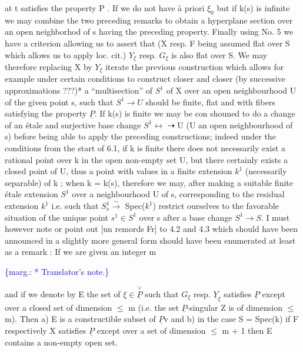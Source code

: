 \documentclass[11pt]{article}
\newcommand{\scanpage}[1]{\par\bigskip\noindent{\small\sffamily[scan #1]}\par}
\newcommand{\mspage}[1]{{\small\sffamily[p.\,#1]}}
\newcommand{\margin}[1]{\textcolor{blue}{\{\textsf{marg.:} #1\}}}
\begin{document}
at t satisfies the property P . If we do not have à priori $\xi_0$ but
if k(s) is infinite we may combine the two preceding remarks to
obtain a hyperplane section over an open neighborhod of s having
the preceding property. Finally using No. 5 we have a criterion
allowing us to assert that (X resp. F being assumed flat over S
which allows us to apply loc. cit.) $Y_\xi$ resp. $G_\xi$ is also flat over
S. We may therefore replacing X by $Y_\xi$ iterate the previous
construction which allows for example under certain conditions to
construct closer and closer (by successive approximations ???)* a
``multisection'' of $S^1$ of X over an open neighbourhood U of the given
point s, such that $S^1 \to U$ should be finite, flat and with fibers
satisfying the property $\underline{P}$. If k(s) is finite we may be con
shouned to do a change of an étale and surjective base change $S^1 \leftrightarrow$
$\dashrightarrow$ U (U an open neighbourhood of s) before being able to apply
the preceding constructions; indeed under the conditions from the
start of 6.1, if k is finite there does not necessarily exist a
rational point over k in the open non-empty set U, but there
certainly exists a closed point of U, thus a point with values in
a finite extension $k^1$ (necessarily separable) of k ; when k =
k(s), therefore we may, after making a suitable finite étale
extension $S^1$ over a neighbourhood U of s, corresponding to the
residual extension $k^1$ i.e. such that $S^1_s \xrightarrow{\sim}$ Spec($k^1$) restrict
ourselves to the favorable situation of the unique point $s^1 \in S^1$
over s after a base change $S^1 \to S$. I must however note or point
out [un remords Fr] to 4.2 and 4.3 which should have been
announced in a slightly more general form should have been
enumerated at least as a remark : If we are given an integer m

\margin{* Translator's note.}

\clearpage
\scanpage{24/33}
\mspage{33}

and if we denote by E the set of $\xi \in \overset{\vee}{\underline{P}}$ such that $G_\xi$ resp. $\underline{Y}_\xi$
satisfies $\underline{P}$ except over a closed set of dimension $\leq$ m (i.e. the
set $\underline{P}$-singular Z is of dimension $\leq$ m).  Then a) E is a
constructible subset of $\underline{P}\mathrm{v}$ and b) in the case S = Spec(k) if F
respectively X satisfies $\underline{P}$ except over a set of dimension $\leq$ m + 1
then E contains a non-empty open set.
\end{document}
